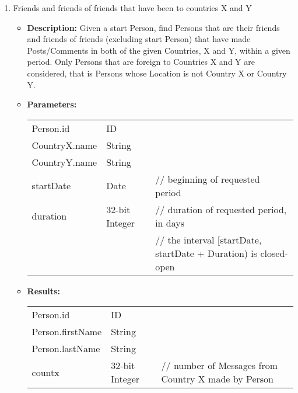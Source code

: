 {\begin{enumerate}
                \item Friends and friends of friends that have been to countries X and Y
                    \begin{itemize}
                        \item \textbf{Description:}
                            Given a start Person, find Persons that are their friends and
                            friends of friends (excluding start Person) that have made
                            Posts/Comments in both of the given Countries, X and Y, within a
                            given period.  Only Persons that are foreign to Countries X and Y
                            are considered, that is Persons whose Location is not Country X or
                            Country Y.
                        \item \textbf{Parameters:} \\
                            \begin{tabular}{lll}
                                Person.id 										& ID & \\
                                CountryX.name									& String & \\
                                CountryY.name									& String & \\
                                startDate										& Date 	& // beginning of requested period \\
                                duration										& 32-bit Integer 					& // duration of requested period, in days \\
                                                  &                                   & // the interval [startDate, startDate + Duration) is closed-open\\
                            \end{tabular}
                        \item \textbf{Results:} \\
                            \begin{tabular}{lll}
                                Person.id 										& ID 	& \\
                                Person.firstName 								& String 			& \\
                                Person.lastName 								& String 			& \\
                                countx 											& 32-bit Integer 	&
                                \parbox[t]{20cm}{// number of Messages from Country X made by Person \par
}
\end{tabular}
\end{itemize}
\end{enumerate}}
